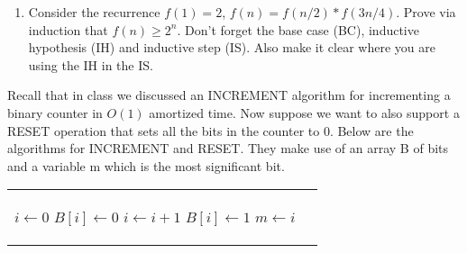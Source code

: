 \documentclass[11pt]{article}
\newcommand{\ans}[1]{}
\begin{document}
\begin{enumerate}
\begin{enumerate}
\pagebreak

\item Consider the recurrence $f(1) = 2$, $f(n) = f(n/2) * f(3n/4)$.  Prove via induction that $f(n) \geq 2^{n}$.  Don't forget the base case (BC), inductive hypothesis (IH) and inductive step (IS).  Also make it clear where you are using the IH in the IS.

\ans{BC: $f(1) = 2 \geq 2^{1}$.  IH:  $\forall_{j < n}, f(j) \geq 2^{n}$.  IS: $f(n) = f(n/2)*f(3n/4) \geq 2^{n/2}*2^{3n/4} \geq 2^{n}$.  The second step holds via the IH.}
  



 \end{enumerate}



Recall that in class we discussed an INCREMENT algorithm for incrementing a binary counter in $O(1)$ amortized time.  Now suppose we want to also support a RESET operation that sets all the bits in the counter to $0$.  Below are the algorithms for INCREMENT and RESET.  They make use of an array B of bits and a variable m which is the most significant bit.



\begin{tabular}{cc}
 \begin{minipage}[t]{3.0in}
\centering
\begin{algorithm}[H]
\caption{INCREMENT($B[0,\ldots,\infty],m$)}
\label{a:phase}

 \begin{algorithmic}[1]
\STATE $i \leftarrow 0$
\WHILE{$B[i] = 1$} 
\STATE $B[i] \leftarrow 0$
\STATE $i \leftarrow i + 1$
\ENDWHILE
\STATE $B[i] \leftarrow 1$
\IF{$i > m$}
\STATE $m \leftarrow i$
\ENDIF 
 \end{algorithmic}
\end{algorithm}

 \end{minipage}

&

 \begin{minipage}[t]{3.00in}
\centering
\begin{algorithm}[H]
\caption{RESET($B[0,\ldots,\infty],m$)}
\label{a:phase}


\end{algorithm}
\end{minipage}
\end{tabular}
\end{enumerate}
\end{document}
